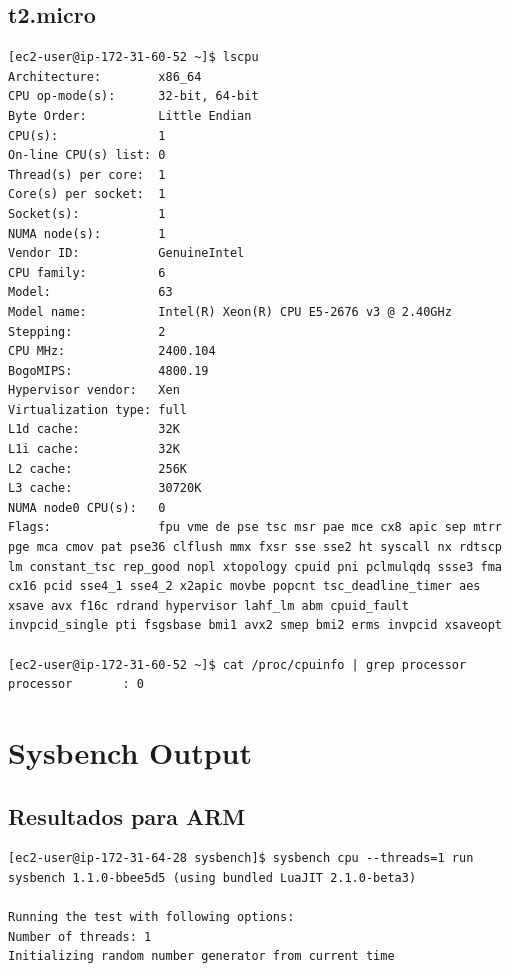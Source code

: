 \documentclass[a4paper,openright,12pt]{article}
\begin{document}
\begin{appendices}
\subsection{t2.micro}
\begin{verbatim}
[ec2-user@ip-172-31-60-52 ~]$ lscpu
Architecture:        x86_64
CPU op-mode(s):      32-bit, 64-bit
Byte Order:          Little Endian
CPU(s):              1
On-line CPU(s) list: 0
Thread(s) per core:  1
Core(s) per socket:  1
Socket(s):           1
NUMA node(s):        1
Vendor ID:           GenuineIntel
CPU family:          6
Model:               63
Model name:          Intel(R) Xeon(R) CPU E5-2676 v3 @ 2.40GHz
Stepping:            2
CPU MHz:             2400.104
BogoMIPS:            4800.19
Hypervisor vendor:   Xen
Virtualization type: full
L1d cache:           32K
L1i cache:           32K
L2 cache:            256K
L3 cache:            30720K
NUMA node0 CPU(s):   0
Flags:               fpu vme de pse tsc msr pae mce cx8 apic sep mtrr pge mca cmov pat pse36 clflush mmx fxsr sse sse2 ht syscall nx rdtscp lm constant_tsc rep_good nopl xtopology cpuid pni pclmulqdq ssse3 fma cx16 pcid sse4_1 sse4_2 x2apic movbe popcnt tsc_deadline_timer aes xsave avx f16c rdrand hypervisor lahf_lm abm cpuid_fault invpcid_single pti fsgsbase bmi1 avx2 smep bmi2 erms invpcid xsaveopt

[ec2-user@ip-172-31-60-52 ~]$ cat /proc/cpuinfo | grep processor
processor       : 0
\end{verbatim}

\newpage
\section{Sysbench Output}\label{anexo:sysbench_output}
\subsection{Resultados para ARM}
\begin{verbatim}
[ec2-user@ip-172-31-64-28 sysbench]$ sysbench cpu --threads=1 run
sysbench 1.1.0-bbee5d5 (using bundled LuaJIT 2.1.0-beta3)

Running the test with following options:
Number of threads: 1
Initializing random number generator from current time



\end{verbatim}
\end{appendices}
\end{document}
